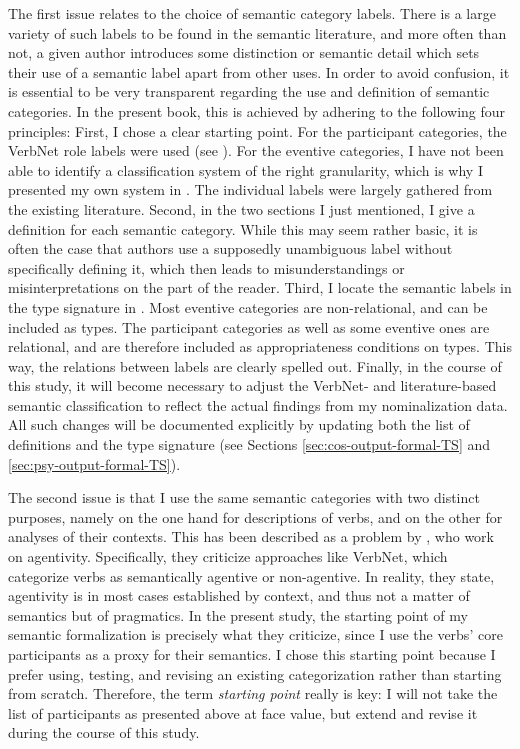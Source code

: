 The first issue relates to the choice of semantic category labels. There is a large variety of such labels to be found in the semantic literature, and more often than not, a given author introduces some distinction or semantic detail which sets their use of a semantic label apart from other uses. In order to avoid confusion, it is essential to be very transparent regarding the use and definition of semantic categories. In the present book, this is achieved by adhering to the following four principles:
First, I chose a clear starting point. For the participant categories, the VerbNet role labels were used (see ). For the eventive categories, I have not been able to identify a classification system of the right granularity, which is why I presented my own system in . The individual labels were largely gathered from the existing literature. 
Second, in the two sections I just mentioned, I give a definition for each semantic category. While this may seem rather basic, it is often the case that authors use a supposedly unambiguous label without specifically defining it, which then leads to misunderstandings or misinterpretations on the part of the reader.  Third, I locate the semantic labels in the type signature in . Most eventive categories are non-relational, and can be included as types. The participant categories as well as some eventive ones are relational, and are therefore included as appropriateness conditions on types. This way, the relations between labels are clearly spelled out. 
Finally, in the course of this study, it will become necessary to adjust the VerbNet- and literature-based semantic classification to reflect the actual findings from my nominalization data. All such changes will be documented explicitly by updating both the list of definitions and the type signature (see Sections \ref{sec:cos-output-formal-TS} and \ref{sec:psy-output-formal-TS}). 

The second issue is that I use the same semantic categories with two distinct purposes, namely 
on the one hand for descriptions of verbs, and on the other for analyses of their contexts. This has been described as a problem by \citet{Huyghe.2020}, who work on agentivity. Specifically, they criticize approaches like VerbNet, which categorize verbs as semantically agentive or non-agentive. In reality, they state, agentivity is in most cases established by context, and thus not a matter of semantics but of pragmatics. 
In the present study, the starting point of my semantic formalization is precisely what they criticize, since I use the verbs' core participants as a proxy for their semantics. I chose this starting point because I prefer using, testing, and revising an existing categorization rather than starting from scratch. Therefore, the term \textit{starting point} really is key: I will not take the list of participants as presented above at face value, but extend and revise it during the course of this study.\largerpage 

